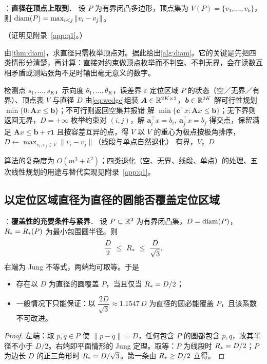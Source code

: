 \begin{theorem}：\textbf{直径在顶点上取到}．\label{thm:diam}
设 $P$ 为有界闭凸多边形，顶点集为 $V(P)=\{v_1,\dots,v_k\}$，则
$\operatorname{diam}(P)=\max_{i<j}\|v_i-v_j\|$。
\end{theorem}

\noindent（证明见附录~\ref{app:q1}。）

由\cref{thm:diam}，求直径只需枚举顶点对。据此给出\cref{alg:diam}。它的关键是先把四类情形分清楚，再计算：直接对约束做顶点枚举而不判空、不判无界，会在读数互相矛盾或测站张角不足时输出毫无意义的数字。

\begin{algorithm}[!htbp]
\caption{有界误差交会定位区域的直径算法}\label{alg:diam}
\begin{algorithmic}[1]
\Require 检测点 $s_1,\dots,s_K$，示向度 $\theta_1,\dots,\theta_K$，误差界 $\varepsilon$
\Ensure 定位区域 $P$ 的状态（空／无界／有界）、顶点表 $V$ 与直径 $D$
\State 由\cref{eq:wedge}组装 $\bm A\in\mathbb{R}^{2K\times2}$，$\bm b\in\mathbb{R}^{2K}$
\State 解可行性规划 $\min\{0:\bm Ax\le\bm b\}$；不可行则返回空集并报错
  \State 解 $\min\{\bm c^{\!\top}x:\bm Ax\le\bm b\}$；无下界则返回无界，$D=+\infty$
\EndFor
\State 枚举约束对 $(i,j)$，解 $\bm a_i^{\!\top}x=b_i,\ \bm a_j^{\!\top}x=b_j$ 得交点，保留满足 $\bm Ax\le\bm b+\tau\bm 1$ 且按容差互异的点，得 $V$
\State 以 $V$ 的重心为极点按极角排序，$D\gets\max_{v_i,v_j\in V}\|v_i-v_j\|$（线段与单点自然退化）
\State \Return 有界，$V$，$D$
\end{algorithmic}
\end{algorithm}

算法的复杂度为 $O(m^3+k^2)$；四类退化（空、无界、线段、单点）的处理、五次线性规划的用途与替代实现见附录~\ref{app:q1}。

\subsection{以定位区域直径为直径的圆能否覆盖定位区域}

\begin{theorem}：\textbf{覆盖性的充要条件与紧界}．\label{thm:jung}
设 $P\subset\mathbb{R}^2$ 为有界闭凸集，$D=\operatorname{diam}(P)$，$R_{*}=R_{*}(P)$ 为最小包围圆半径。则
\begin{equation}\label{eq:jung}
  \frac{D}{2}\ \le\ R_{*}\ \le\ \frac{D}{\sqrt3},
\end{equation}
右端为 Jung 不等式，两端均可取等。于是
\begin{itemize}
  \item 存在以 $D$ 为直径的圆覆盖 $P$，当且仅当 $R_{*}=D/2$；
  \item 一般情况下只能保证：以 $\dfrac{2D}{\sqrt3}\approx1.1547\,D$ 为直径的圆必能覆盖 $P$，且该系数不可改进。
\end{itemize}
\end{theorem}
\begin{proof}
左端：取 $p,q\in P$ 使 $\|p-q\|=D$，任何包含 $P$ 的圆都包含 $p,q$，故其半径不小于 $D/2$。右端即平面情形的 Jung 定理。取等：$P$ 为线段时 $R_{*}=D/2$；$P$ 为边长 $D$ 的正三角形时 $R_{*}=D/\sqrt3$。第一条由 $R_{*}\ge D/2$ 立得。
\end{proof}

